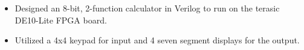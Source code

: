\begin{itemize}
    \item Designed an 8-bit, 2-function calculator in Verilog to run on the terasic DE10-Lite FPGA board.
    \item Utilized a 4x4 keypad for input and 4 seven segment displays for the output.
\end{itemize}